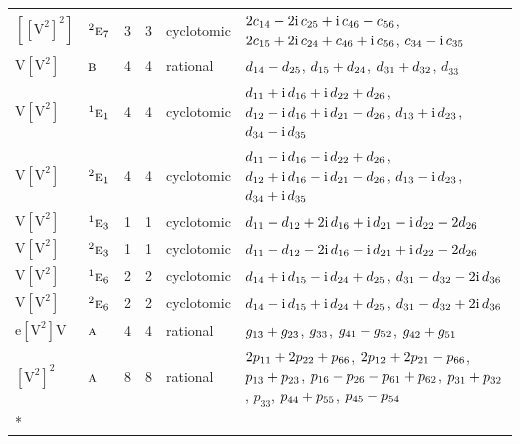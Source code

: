 \documentclass[10pt,a4paper]{article}
\numberwithin{equation}{section}
\newcommand{\irr}[1]{\text{\normalfont\scshape #1}}
\newcommand{\conjpair}[1]{{}^{#1}}
\newcommand{\iunit}{\mathrm{i}}
\newcommand{\jahn}[1]{\mathrm{#1}}
\newlength{\fillwidth}\newlength{\cellwidth}\newlength{\colwidth}
\newcommand{\signbreak}{\penalty100\relax}
\begin{document}
{\begin{longtable}{@{}llrrl>{\RaggedRight\arraybackslash}p{\fillwidth}@{}}
$\jahn{[[V^{2}]^{2}]}$ & $\conjpair{2}\irr{e}_{7}$ & 3 & 3 & cyclotomic & $2c_{14} -\signbreak 2\iunit{}\,c_{25} +\signbreak \iunit{}\,c_{46} -\signbreak c_{56}$, $2c_{15} +\signbreak 2\iunit{}\,c_{24} +\signbreak c_{46} +\signbreak \iunit{}\,c_{56}$, $c_{34} -\signbreak \iunit{}\,c_{35}$\\
$\jahn{V[V^{2}]}$ & $\irr{b}$ & 4 & 4 & rational & $d_{14} -\signbreak d_{25}$, $d_{15} +\signbreak d_{24}$, $d_{31} +\signbreak d_{32}$, $d_{33}$\\
$\jahn{V[V^{2}]}$ & $\conjpair{1}\irr{e}_{1}$ & 4 & 4 & cyclotomic & $d_{11} +\signbreak \iunit{}\,d_{16} +\signbreak \iunit{}\,d_{22} +\signbreak d_{26}$, $d_{12} -\signbreak \iunit{}\,d_{16} +\signbreak \iunit{}\,d_{21} -\signbreak d_{26}$, $d_{13} +\signbreak \iunit{}\,d_{23}$, $d_{34} -\signbreak \iunit{}\,d_{35}$\\
$\jahn{V[V^{2}]}$ & $\conjpair{2}\irr{e}_{1}$ & 4 & 4 & cyclotomic & $d_{11} -\signbreak \iunit{}\,d_{16} -\signbreak \iunit{}\,d_{22} +\signbreak d_{26}$, $d_{12} +\signbreak \iunit{}\,d_{16} -\signbreak \iunit{}\,d_{21} -\signbreak d_{26}$, $d_{13} -\signbreak \iunit{}\,d_{23}$, $d_{34} +\signbreak \iunit{}\,d_{35}$\\
$\jahn{V[V^{2}]}$ & $\conjpair{1}\irr{e}_{3}$ & 1 & 1 & cyclotomic & $d_{11} -\signbreak d_{12} +\signbreak 2\iunit{}\,d_{16} +\signbreak \iunit{}\,d_{21} -\signbreak \iunit{}\,d_{22} -\signbreak 2d_{26}$\\
$\jahn{V[V^{2}]}$ & $\conjpair{2}\irr{e}_{3}$ & 1 & 1 & cyclotomic & $d_{11} -\signbreak d_{12} -\signbreak 2\iunit{}\,d_{16} -\signbreak \iunit{}\,d_{21} +\signbreak \iunit{}\,d_{22} -\signbreak 2d_{26}$\\
$\jahn{V[V^{2}]}$ & $\conjpair{1}\irr{e}_{6}$ & 2 & 2 & cyclotomic & $d_{14} +\signbreak \iunit{}\,d_{15} -\signbreak \iunit{}\,d_{24} +\signbreak d_{25}$, $d_{31} -\signbreak d_{32} -\signbreak 2\iunit{}\,d_{36}$\\
$\jahn{V[V^{2}]}$ & $\conjpair{2}\irr{e}_{6}$ & 2 & 2 & cyclotomic & $d_{14} -\signbreak \iunit{}\,d_{15} +\signbreak \iunit{}\,d_{24} +\signbreak d_{25}$, $d_{31} -\signbreak d_{32} +\signbreak 2\iunit{}\,d_{36}$\\
$\jahn{e[V^{2}]V}$ & $\irr{a}$ & 4 & 4 & rational & $\mathnormal{g}_{13} +\signbreak \mathnormal{g}_{23}$, $\mathnormal{g}_{33}$, $\mathnormal{g}_{41} -\signbreak \mathnormal{g}_{52}$, $\mathnormal{g}_{42} +\signbreak \mathnormal{g}_{51}$\\
$\jahn{[V^{2}]^{2}}$ & $\irr{a}$ & 8 & 8 & rational & $2p_{11} +\signbreak 2p_{22} +\signbreak p_{66}$, $2p_{12} +\signbreak 2p_{21} -\signbreak p_{66}$, $p_{13} +\signbreak p_{23}$, $p_{16} -\signbreak p_{26} -\signbreak p_{61} +\signbreak p_{62}$, $p_{31} +\signbreak p_{32}$, $p_{33}$, $p_{44} +\signbreak p_{55}$, $p_{45} -\signbreak p_{54}$\\*

\end{longtable}}
\end{document}
